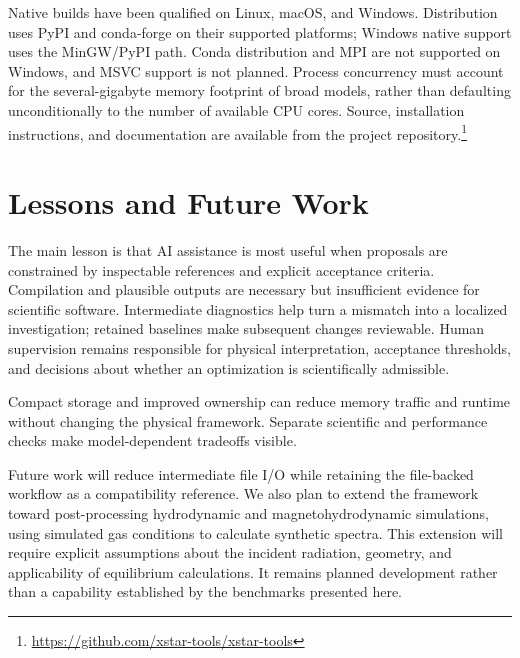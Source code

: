 \documentclass[11pt,twoside]{article}
\begin{document}
Native builds have been qualified on Linux, macOS, and Windows. Distribution uses PyPI and conda-forge on their supported platforms; Windows native support uses the MinGW/PyPI path. Conda distribution and MPI are not supported on Windows, and MSVC support is not planned. Process concurrency must account for the several-gigabyte memory footprint of broad models, rather than defaulting unconditionally to the number of available CPU cores. Source, installation instructions, and documentation are available from the project repository.\footnote{\url{https://github.com/xstar-tools/xstar-tools}}

\section{Lessons and Future Work}
The main lesson is that AI assistance is most useful when proposals are constrained by inspectable references and explicit acceptance criteria. Compilation and plausible outputs are necessary but insufficient evidence for scientific software. Intermediate diagnostics help turn a mismatch into a localized investigation; retained baselines make subsequent changes reviewable. Human supervision remains responsible for physical interpretation, acceptance thresholds, and decisions about whether an optimization is scientifically admissible.

Compact storage and improved ownership can reduce memory traffic and runtime without changing the physical framework. Separate scientific and performance checks make model-dependent tradeoffs visible.

Future work will reduce intermediate file I/O while retaining the file-backed workflow as a compatibility reference. We also plan to extend the framework toward post-processing hydrodynamic and magnetohydrodynamic simulations, using simulated gas conditions to calculate synthetic spectra. This extension will require explicit assumptions about the incident radiation, geometry, and applicability of equilibrium calculations. It remains planned development rather than a capability established by the benchmarks presented here.


\end{document}
